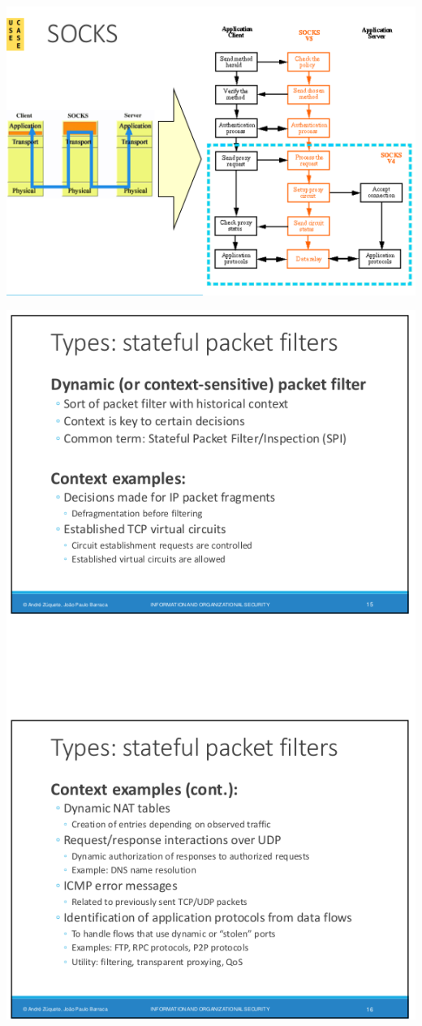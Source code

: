 \documentclass{article}
\begin{document}
\begin{center}
  \includegraphics[scale=0.4]{56}
\end{center}

\begin{center}
  \includegraphics[scale=0.4]{57}
\end{center}
\end{document}
